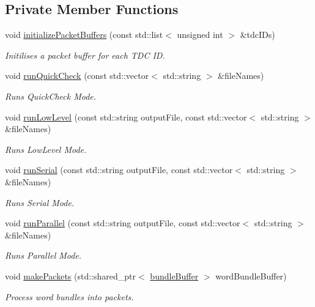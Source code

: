 \subsection*{Private Member Functions}
\begin{DoxyCompactItemize}
\item 
void \hyperlink{class_processor_aa9ad1e9d6f3d217e23649e42cd07de90}{initialize\+Packet\+Buffers} (const std\+::list$<$ unsigned int $>$ \&tdc\+I\+Ds)
\begin{DoxyCompactList}\small\item\em Initilises a packet buffer for each T\+DC ID. \end{DoxyCompactList}\item 
void \hyperlink{class_processor_ae045ebe853cd1f2124ecb93b829a9113}{run\+Quick\+Check} (const std\+::vector$<$ std\+::string $>$ \&file\+Names)
\begin{DoxyCompactList}\small\item\em Runs Quick\+Check Mode. \end{DoxyCompactList}\item 
void \hyperlink{class_processor_abb921abb494ace88b4ef5ba9137f21d2}{run\+Low\+Level} (const std\+::string output\+File, const std\+::vector$<$ std\+::string $>$ \&file\+Names)
\begin{DoxyCompactList}\small\item\em Runs Low\+Level Mode. \end{DoxyCompactList}\item 
void \hyperlink{class_processor_a0f2fc9c7e8c9271f7a9b171814ad094f}{run\+Serial} (const std\+::string output\+File, const std\+::vector$<$ std\+::string $>$ \&file\+Names)
\begin{DoxyCompactList}\small\item\em Runs Serial Mode. \end{DoxyCompactList}\item 
void \hyperlink{class_processor_ac95806facc4b5cbeb8a1b6df0cc9e431}{run\+Parallel} (const std\+::string output\+File, const std\+::vector$<$ std\+::string $>$ \&file\+Names)
\begin{DoxyCompactList}\small\item\em Runs Parallel Mode. \end{DoxyCompactList}\item 
void \hyperlink{class_processor_a554de487c5e8205872151fbedb315291}{make\+Packets} (std\+::shared\+\_\+ptr$<$ \hyperlink{class_processor_a531b4c5f7c0d810fc6e9e1dd3d115725}{bundle\+Buffer} $>$ word\+Bundle\+Buffer)
\begin{DoxyCompactList}\small\item\em Process word bundles into packets. \end{DoxyCompactList}\item 

\end{DoxyCompactItemize}
